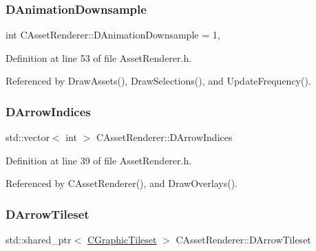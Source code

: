 \subsubsection{\texorpdfstring{D\+Animation\+Downsample}{DAnimationDownsample}}
{\footnotesize\ttfamily int C\+Asset\+Renderer\+::\+D\+Animation\+Downsample = 1\hspace{0.3cm}{\ttfamily [static]}, {\ttfamily [protected]}}



Definition at line 53 of file Asset\+Renderer.\+h.



Referenced by Draw\+Assets(), Draw\+Selections(), and Update\+Frequency().

\hypertarget{classCAssetRenderer_a7bc2bb5c49d9ed462f5d9dec8bc3b939}{}\label{classCAssetRenderer_a7bc2bb5c49d9ed462f5d9dec8bc3b939} 
\subsubsection{\texorpdfstring{D\+Arrow\+Indices}{DArrowIndices}}
{\footnotesize\ttfamily std\+::vector$<$ int $>$ C\+Asset\+Renderer\+::\+D\+Arrow\+Indices\hspace{0.3cm}{\ttfamily [protected]}}



Definition at line 39 of file Asset\+Renderer.\+h.



Referenced by C\+Asset\+Renderer(), and Draw\+Overlays().

\hypertarget{classCAssetRenderer_a2aa6a3a0e3ae05b3165f88dcd216ffc6}{}\label{classCAssetRenderer_a2aa6a3a0e3ae05b3165f88dcd216ffc6} 
\subsubsection{\texorpdfstring{D\+Arrow\+Tileset}{DArrowTileset}}
{\footnotesize\ttfamily std\+::shared\+\_\+ptr$<$ \hyperlink{classCGraphicTileset}{C\+Graphic\+Tileset} $>$ C\+Asset\+Renderer\+::\+D\+Arrow\+Tileset\hspace{0.3cm}{\ttfamily [protected]}}



